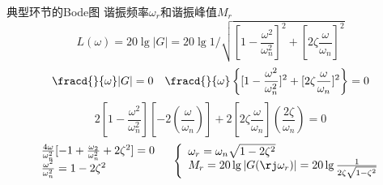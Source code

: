 \documentclass[handout,cjkutf8,table,aspectratio=1610]{beamer} %
\begin{document}
\begin{frame}{典型环节的Bode图}
	谐振频率$\omega_r$和谐振峰值$M_r$
	$$L(\omega) = 20\lg |G| = 20\lg 1/\sqrt{[1-\frac{\omega^2}{\omega_n^2}]^2+[2\zeta\frac{\omega}{\omega_n}]^2}$$
	$$\fracd{}{\omega} |G| = 0\quad \fracd{}{\omega}\left\{[1-\frac{\omega^2}{\omega_n^2}]^2+[2\zeta\frac{\omega}{\omega_n}]^2\right\} = 0$$
	$$2[1-\frac{\omega^2}{\omega_n^2}][-2(\frac{\omega}{\omega_n})] + 2[2\zeta\frac{\omega}{\omega_n}](\frac{2\zeta}{\omega_n}) = 0$$
	$$\begin{array}{l}
		\frac{4\omega}{\omega_n^2}[-1+\frac{\omega_2}{\omega_n^2}+2\zeta^2] = 0\\
		\frac{\omega^2}{\omega_n^2} = 1-2\zeta^2
	\end{array}\quad
	\left\{\begin{array}{l}
		\omega_r = \omega_n\sqrt{1-2\zeta^2}\\
		M_r = 20\lg |G(\rj\omega_r)| = 20\lg \frac{1}{2\zeta\sqrt{1-\zeta^2}}
	\end{array}\right.$$
\end{frame}
\end{document}
